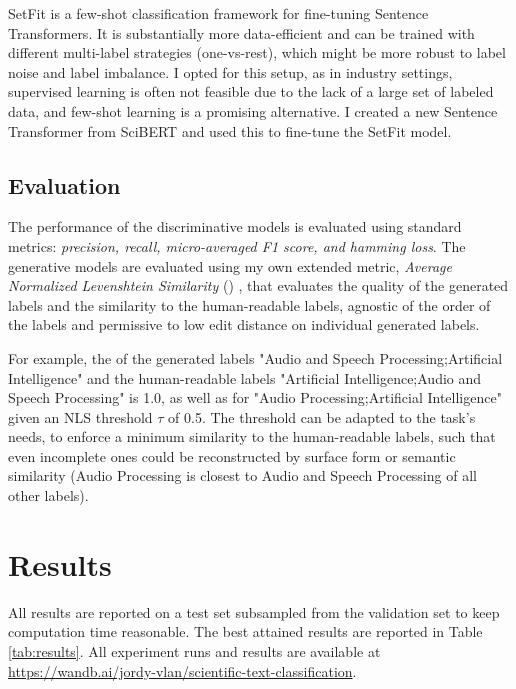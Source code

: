 \documentclass[11pt,letterpaper]{article}
\begin{document}
SetFit \cite{tunstall2022efficient} is a few-shot classification framework for fine-tuning Sentence Transformers. It is substantially more data-efficient and can be trained with different multi-label strategies (one-vs-rest), which might be more robust to label noise and label imbalance. I opted for this setup, as in industry settings, supervised learning is often not feasible due to the lack of a large set of labeled data, and few-shot learning is a promising alternative. I created a new Sentence Transformer from SciBERT and used this to fine-tune the SetFit model.

\subsection{Evaluation}

The performance of the discriminative models is evaluated using standard metrics: \textit{precision, recall, micro-averaged F1 score, and hamming loss}.
The generative models are evaluated using my own extended metric, \textit{Average Normalized Levenshtein Similarity} (\ANLS) \cite{VanLandeghem2023dude}, that evaluates the quality of the generated labels and the similarity to the human-readable labels, agnostic of the order of the labels and permissive to low edit distance on individual generated labels.

For example, the \ANLS{} of the generated labels "Audio and Speech Processing;Artificial Intelligence" and the human-readable labels "Artificial Intelligence;Audio and Speech Processing" is 1.0, as well as for "Audio Processing;Artificial Intelligence" given an NLS threshold $\tau$ of 0.5. The threshold can be adapted to the task's needs, \eg to enforce a minimum similarity to the human-readable labels, such that even incomplete ones could be reconstructed by surface form or semantic similarity (\eg Audio Processing is closest to Audio and Speech Processing of all other labels).

\section{Results}

All results are reported on a test set subsampled from the validation set to keep computation time reasonable. The best attained results are reported in Table \ref{tab:results}.
All experiment runs and results are available at \url{https://wandb.ai/jordy-vlan/scientific-text-classification}.
\end{document}
